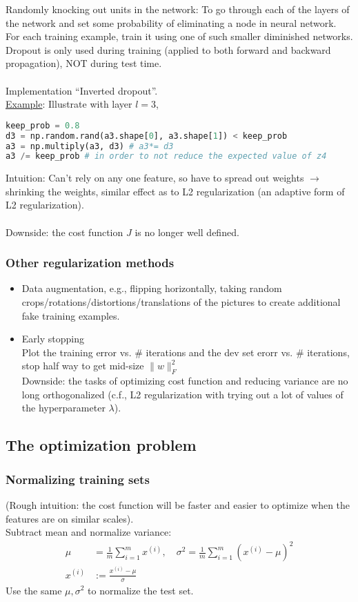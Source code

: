 Randomly knocking out units in the network: To go through each of the layers of the network and set some probability of eliminating a node in neural network. For each training example, train it using one of such smaller diminished networks. Dropout is only used during training (applied to both forward and backward propagation), NOT during test time.\\\\
Implementation ``Inverted dropout''.\\
\underline{Example}: Illustrate with layer $l = 3$, 
\begin{lstlisting}[language=Python]
keep_prob = 0.8
d3 = np.random.rand(a3.shape[0], a3.shape[1]) < keep_prob
a3 = np.multiply(a3, d3) # a3*= d3
a3 /= keep_prob # in order to not reduce the expected value of z4
\end{lstlisting}
Intuition: Can't rely on any one feature, so have to spread out weights $\rightarrow$ shrinking the weights, similar effect as to L2 regularization (an adaptive form of L2 regularization).
\\\\
Downside: the cost function $J$ is no longer well defined.

\subsubsection{Other regularization methods}
\begin{itemize}
\item
Data augmentation, e.g., flipping horizontally, taking random crops/rotations/distortions/translations of the pictures to create additional fake training examples.
\item
Early stopping\\
Plot the training error vs. \# iterations and the dev set erorr vs. \# iterations, stop half way to get mid-size $\|w\|_F^2$\\
Downside: the tasks of optimizing cost function and reducing variance are no long orthogonalized (c.f., L2 regularization with trying out a lot of values of the hyperparameter $\lambda$).
\end{itemize}


%
\subsection{The optimization problem}

\subsubsection{Normalizing training sets}
(Rough intuition: the cost function will be faster and easier to optimize when the features are on similar scales).\\
Subtract mean and normalize variance:
\begin{align*}
\mu &= \frac{1}{m}\sum_{i = 1}^{m}x^{(i)}, \quad
\sigma^2= \frac{1}{m}\sum_{i = 1}^{m}(x^{(i)} - \mu)^2\\
x^{(i)} &:= \frac{x^{(i)} - \mu}{\sigma}
\end{align*}
Use the same $\mu, \sigma^2$ to normalize the test set.

